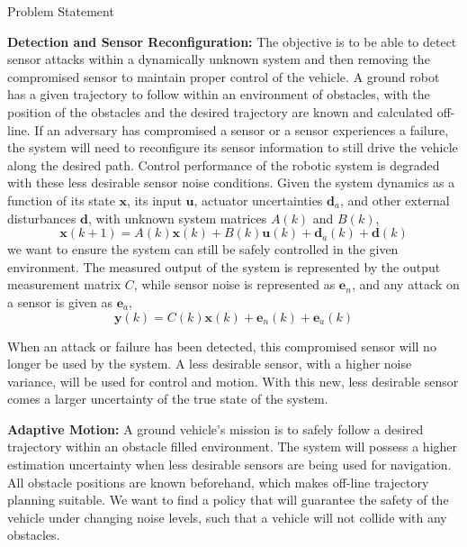\begin{section}{Problem Statement}
\begin{problem} 
\label{problem1} {\textbf{Detection and Sensor Reconfiguration:}} 
The objective is to be able to detect sensor attacks within a dynamically unknown system and then removing the compromised sensor to maintain proper control of the vehicle.
	A ground robot has a given trajectory to follow within an environment of obstacles, with the position of the obstacles and the desired trajectory are known and calculated off-line. If an adversary has compromised a sensor or a sensor experiences a failure, the system will need to reconfigure its sensor information to still drive the vehicle along the desired path. Control performance of the robotic system is degraded with these less desirable sensor noise conditions. Given the system dynamics as a function of its state $ \bm{x} $, its input $ \bm{u}$, actuator uncertainties $ \bm{d}_a $, and other external disturbances $ \bm{d} $, with unknown system matrices $ A(k) $ and $ B(k) $,
	\begin{equation}
		\bm{x}(k+1) = A(k)\bm{x}(k) + B(k)\bm{u}(k) + \bm{d}_a(k) + \bm{d}(k)
	\end{equation}
we want to ensure the system can still be safely controlled in the given environment. The measured output of the system is represented by the output measurement matrix $ C $, while sensor noise is represented as $ \bm{e}_n $, and any attack on a sensor is given as $ \bm{e}_a$,
	\begin{equation}
		\bm{y}(k) = C(k)\bm{x}(k) + \bm{e}_n(k) + \bm{e}_a(k)
	\end{equation}
	
When an attack or failure has been detected, this compromised sensor will no longer be used by the system. A less desirable sensor, with a higher noise variance, will be used for control and motion. With this new, less desirable sensor comes a larger uncertainty of the true state of the system.
	
\end{problem}
	
\begin{problem} \label{problem2} {\textbf{Adaptive Motion:}} 
A ground vehicle's mission is to safely follow a desired trajectory within an obstacle filled environment. The system will possess a higher estimation uncertainty when less desirable sensors are being used for navigation. All obstacle positions are known beforehand, which makes off-line trajectory planning suitable. We want to find a policy that will guarantee the safety of the vehicle under changing noise levels, such that a vehicle will not collide with any obstacles.


\end{problem}
\end{section}
